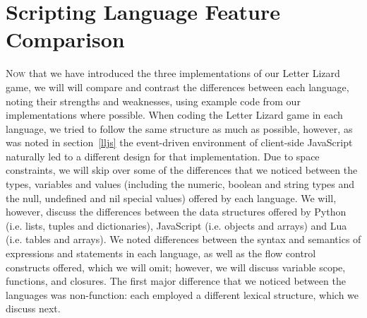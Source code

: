 \section{Scripting Language Feature Comparison}
\label{comparison}









\lettrine[nindent=0em,lines=3]{N}{ow} that we have introduced the three implementations of
our Letter Lizard game, we will will compare and contrast the differences between
each language, noting their strengths and weaknesses, using example code from our
implementations where possible. When coding the Letter Lizard game in each language,
we tried to follow the same structure as much as possible, however, as was noted in section~\ref{lljs}
the event-driven environment of client-side JavaScript naturally led to a different
design for that implementation. Due to space constraints, we will skip over some of
the differences that we noticed between the types, variables and values (including 
the numeric, boolean and string types and the null, undefined and nil special values)
offered by each language.
We will, however, discuss the differences between the data structures offered by
Python (i.e. lists, tuples and dictionaries), JavaScript (i.e. objects and arrays)
and Lua (i.e. tables and arrays). We noted differences between the syntax and semantics
of expressions and statements in each language, as well as the flow
control constructs offered, which we will omit; however, we will discuss
variable scope, functions, and closures. The first major difference that we
noticed between the languages was non-function: each employed a different lexical
structure, which we discuss next.

